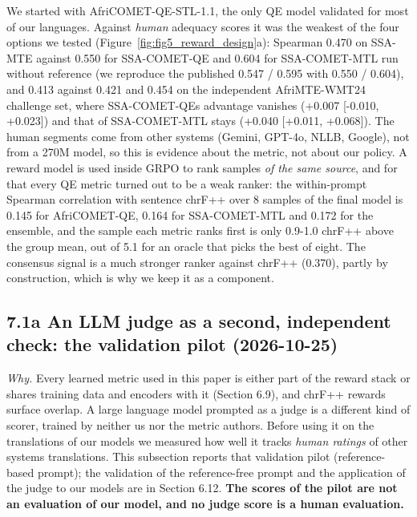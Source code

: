 We started with AfriCOMET-QE-STL-1.1, the only QE model validated for most of our languages. Against \emph{human} adequacy scores it was the weakest of the four options we tested (Figure~\ref{fig:fig5_reward_design}a): Spearman 0.470 on SSA-MTE against 0.550 for SSA-COMET-QE and 0.604 for SSA-COMET-MTL run without reference (we reproduce the published 0.547 / 0.595 with 0.550 / 0.604), and 0.413 against 0.421 and 0.454 on the independent AfriMTE-WMT24 challenge set, where SSA-COMET-QE\textquotesingle s advantage vanishes (+0.007 {[}-0.010, +0.023{]}) and that of SSA-COMET-MTL stays (+0.040 {[}+0.011, +0.068{]}). The human segments come from other systems (Gemini, GPT-4o, NLLB, Google), not from a 270M model, so this is evidence about the metric, not about our policy. A reward model is used inside GRPO to rank samples \emph{of the same source}, and for that every QE metric turned out to be a weak ranker: the within-prompt Spearman correlation with sentence chrF++ over 8 samples of the final model is 0.145 for AfriCOMET-QE, 0.164 for SSA-COMET-MTL and 0.172 for the ensemble, and the sample each metric ranks first is only 0.9-1.0 chrF++ above the group mean, out of 5.1 for an oracle that picks the best of eight. The consensus signal is a much stronger ranker against chrF++ (0.370), partly by construction, which is why we keep it as a component.

\subsection{7.1a An LLM judge as a second, independent check: the validation pilot (2026-10-25)}\label{a-an-llm-judge-as-a-second-independent-check-the-validation-pilot-2026-10-25}

\emph{Why.} Every learned metric used in this paper is either part of the reward stack or shares training data and encoders with it (Section 6.9), and chrF++ rewards surface overlap. A large language model prompted as a judge is a different kind of scorer, trained by neither us nor the metric authors. Before using it on the translations of our models we measured how well it tracks \emph{human ratings} of other systems\textquotesingle{} translations. This subsection reports that validation pilot (reference-based prompt); the validation of the reference-free prompt and the application of the judge to our models are in Section 6.12. \textbf{The scores of the pilot are not an evaluation of our model, and no judge score is a human evaluation.}

